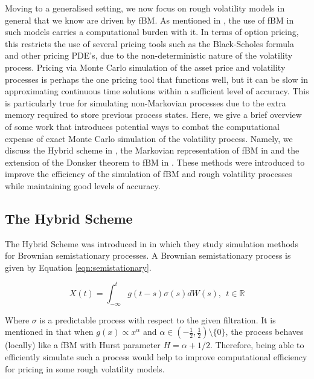 \documentclass[12pt,oneside]{article}
\begin{document}
Moving to a generalised setting, we now focus on rough volatility models in general that we know are driven by fBM. As mentioned in \cite{jacquier2020deep}, the use of fBM in such models carries a computational burden with it. In terms of option pricing, this restricts the use of several pricing tools such as the Black-Scholes formula and other pricing PDE's, due to the non-deterministic nature of the volatility process.  Pricing via Monte Carlo simulation of the asset price and volatility processes is perhaps the one pricing tool that functions well, but it can be slow in approximating continuous time solutions within a sufficient level of accuracy. This is particularly true for simulating non-Markovian processes due to the extra memory required to store previous process states. Here, we give a brief overview of some work that introduces potential ways to combat the computational expense of exact Monte Carlo simulation of the volatility process. Namely, we discuss the Hybrid scheme in \cite{Bennedsen_2017}, the Markovian representation of fBM in \cite{harms2020strong} and the extension of the Donsker theorem to fBM in \cite{horvath2019functional}. These methods were introduced to improve the efficiency of the simulation of fBM and rough volatility processes while maintaining good levels of accuracy.

\subsection{The Hybrid Scheme}
\label{subsec:hybrid_scheme}
The Hybrid Scheme was introduced in \cite{Bennedsen_2017} in which they study simulation methods for Brownian semistationary processes. A Brownian semistationary process is given by Equation \ref{eqn:semistationary}. 

\begin{equation}
\label{eqn:semistationary}
X(t)=\int_{-\infty}^t g(t-s) \sigma(s) dW(s),  \ \  t\in\mathbb{R}
\end{equation}

Where $\sigma$ is a predictable process with respect to the given filtration. It is mentioned in \cite{Bennedsen_2017} that when $g(x) \propto x^\alpha$ and $\alpha \in (-\frac{1}{2}, \frac{1}{2}) \setminus \{0\}$, the process behaves (locally) like a fBM with Hurst parameter $H=\alpha+1/2$.  Therefore, being able to efficiently simulate such a process would help to improve computational efficiency for pricing in some rough volatility models.  
\end{document}
